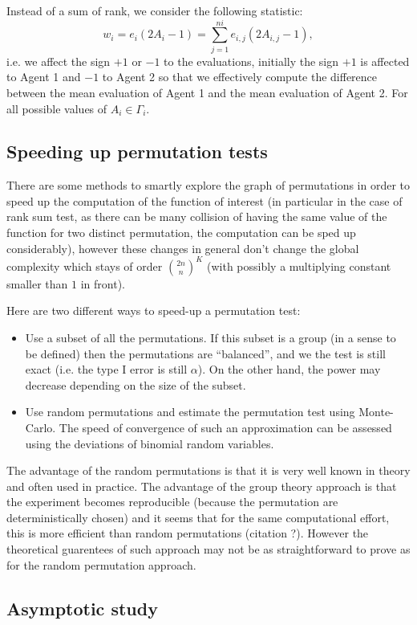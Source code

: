 \documentclass{article}
\theoremstyle{plain}
\theoremstyle{remark}
\newcommand{\1}{\mathbbm{1}}
\numberwithin{equation}{section}
\begin{document}
Instead of a sum of rank, we consider the following statistic:
$$w_i=e_i(2A_i-1)=\sum_{j=1}^{ni} e_{i,j}(2A_{i,j}-1),$$
i.e. we affect the sign $+1$ or $-1$ to the evaluations, initially the sign $+1$ is affected to Agent 1 and $-1$ to Agent 2 so that we effectively compute the difference between the mean evaluation of Agent 1 and the mean evaluation of Agent 2. For all possible values of $A_i\in \Gamma_i$.

\subsection{Speeding up permutation tests}
There are some methods to smartly explore the graph of permutations in order to speed up the computation of the function of interest (in particular in the case of rank sum test, as there can be many collision of having the same value of the function for two distinct permutation, the computation can be sped up considerably), however these changes in general don't change the global complexity which stays of order ${2n \choose n}^K$ (with possibly a multiplying constant smaller than $1$ in front).

Here are two different ways to speed-up a permutation test:
\begin{itemize}
\item Use a subset of all the permutations. If this subset is a group (in a sense to be defined) then the permutations are ``balanced'', and we the test is still exact (i.e. the type I error is still $\alpha$). On the other hand, the power may decrease depending on the size of the subset.
\item Use random permutations and estimate the permutation test using Monte-Carlo. The speed of convergence of such an approximation can be assessed using the deviations of binomial random variables.
\end{itemize}
The advantage of the random permutations is that it is very well known in theory and often used in practice. The advantage of the group theory approach is that the experiment becomes reproducible (because the permutation are deterministically chosen) and it seems that for the same computational effort, this is more efficient than random permutations (citation ?). However the theoretical guarentees of such approach may not be as straightforward to prove as for the random permutation approach.

\subsection{Asymptotic study}
\end{document}
